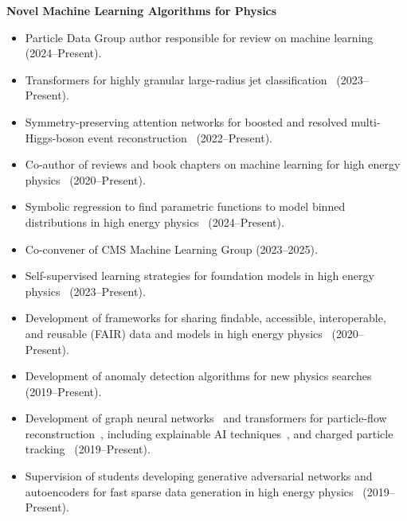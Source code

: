 \documentclass[11pt]{res}
\begin{document}
\begin{resume}
  \textbf{Novel Machine Learning Algorithms for Physics}
  \begin{itemize}
    \itemsep-0.3em
    \item Particle Data Group author responsible for review on machine learning~\cite{Duarte:2025qbk} (2024--Present).
    \item Transformers for highly granular large-radius jet classification~\cite{CMS:2026uph,Li:2024htp} (2023--Present).
    \item Symmetry-preserving attention networks for boosted and resolved multi-Higgs-boson event reconstruction~\cite{Li:2024qfq} (2022--Present).
    \item Co-author of reviews and book chapters on machine learning for high energy physics~\cite{Duarte:2024xkc,Chien:2024gnn,Duarte:2024lsg,Duarte:2022efficient,Deiana:2021niw,Duarte:2020ngm} (2020--Present).
    \item Symbolic regression to find parametric functions to model binned distributions in high energy physics~\cite{Tsoi:2024pbn} (2024--Present).
    \item Co-convener of CMS Machine Learning Group ({2023--2025}).
    \item Self-supervised learning strategies for foundation models in high energy physics~\cite{Hao:2026qbz,Hao:2025abk,Zhao:2024kry,Katel:2024ygn} (2023--Present).
    \item Development of frameworks for sharing findable, accessible, interoperable, and reusable (FAIR) data and models in high energy physics~\cite{Kansal:2023joss,Huerta:2022kgj,Duarte:2022job,Chen:2021euv} ({2020--Present}).
    \item Development of anomaly detection algorithms for new physics searches~\cite{CMS-DP-2025-061,CMS-DP-2024-059,CMS-DP-2023-079,Hao:2022zns,Govorkova:2021utb,Jawahar:2021vyu,Aarrestad:2021oeb,Tsan:2021brw,Kasieczka:2021xcg,Wozniak:2020} ({2019--Present}).
    \item Development of graph neural networks~\cite{Chien:2024gnn,Duarte:2020ngm} and transformers for particle-flow reconstruction~\cite{Mokhtar:2026gdb,CMS:2026znb,CMS-DP-2025-033,Mokhtar:2025zqs,Pata:2023rhh,Mokhtar:2023fzl,CMS-DP-2022-061,Pata:2022wam,CMS-DP-2021-030,Pata:2021oez}, including explainable AI techniques~\cite{Mokhtar:2022pwm,Mokhtar:2021bkf}, and charged particle tracking~\cite{Huang:2023bny,Elabd:2021lgo,Dezoort:2021kfk,Heintz:2020soy} ({2019--Present}).
    \item Supervision of students developing generative adversarial networks and autoencoders for fast sparse data generation in high energy physics~\cite{Li:2023xhj,Kansal:2022spb,Touranakou:2022qrp,Kansal:2021cqp,Orzari:2021suh,Kansal:2020svm} ({2019--Present}).

\end{itemize}
\end{resume}
\end{document}
